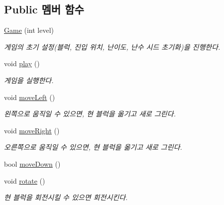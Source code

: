 \subsection*{Public 멤버 함수}
\begin{DoxyCompactItemize}
\item 
\mbox{\hyperlink{class_game_a46a5ded6c47eeab8c880ebf0d6abd0cf}{Game}} (int level)
\begin{DoxyCompactList}\small\item\em 게임의 초기 설정(블럭, 진입 위치, 난이도, 난수 시드 초기화)을 진행한다. \end{DoxyCompactList}\item 
void \mbox{\hyperlink{class_game_aa333825d0bca80e91e53c7e23f053405}{play}} ()
\begin{DoxyCompactList}\small\item\em 게임을 실행한다. \end{DoxyCompactList}\item 
void \mbox{\hyperlink{class_game_a3bd586b9c1bcd71f78bc2c2f7e2fe9e7}{move\+Left}} ()
\begin{DoxyCompactList}\small\item\em 왼쪽으로 움직일 수 있으면, 현 블럭을 옮기고 새로 그린다. \end{DoxyCompactList}\item 
void \mbox{\hyperlink{class_game_a36ee055aa2c311deea72c38f50814007}{move\+Right}} ()
\begin{DoxyCompactList}\small\item\em 오른쪽으로 움직일 수 있으면, 현 블럭을 옮기고 새로 그린다. \end{DoxyCompactList}\item 
bool \mbox{\hyperlink{class_game_af379862400da53dd8f296f0990c0953f}{move\+Down}} ()
\item 
void \mbox{\hyperlink{class_game_a8727c9c167265bff376f606d02687c6b}{rotate}} ()
\begin{DoxyCompactList}\small\item\em 현 블럭을 회전시킬 수 있으면 회전시킨다. \end{DoxyCompactList}\end{DoxyCompactItemize}
